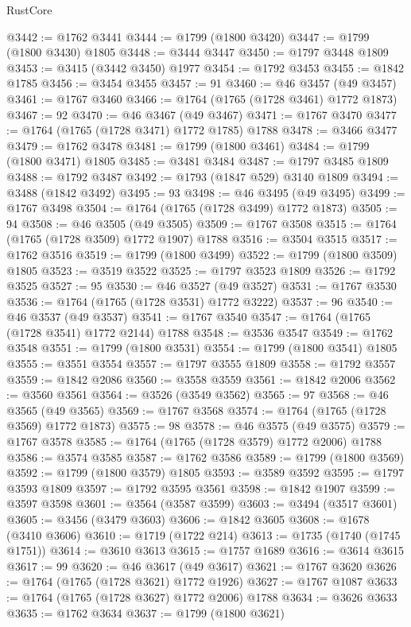 \begin{lexlean}{RustCore}
\begin{coremodule}
@3442 := @1762 @3441
@3444 := @1799 (@1800 @3420)
@3447 := @1799 (@1800 @3430) @1805
@3448 := @3444 @3447
@3450 := @1797 @3448 @1809
@3453 := @3415 (@3442 @3450) @1977
@3454 := @1792 @3453
@3455 := @1842 @1785
@3456 := @3454 @3455
@3457 := 91
@3460 := @46 @3457 (@49 @3457)
@3461 := @1767 @3460
@3466 := @1764 (@1765 (@1728 @3461) @1772 @1873)
@3467 := 92
@3470 := @46 @3467 (@49 @3467)
@3471 := @1767 @3470
@3477 := @1764 (@1765 (@1728 @3471) @1772 @1785) @1788
@3478 := @3466 @3477
@3479 := @1762 @3478
@3481 := @1799 (@1800 @3461)
@3484 := @1799 (@1800 @3471) @1805
@3485 := @3481 @3484
@3487 := @1797 @3485 @1809
@3488 := @1792 @3487
@3492 := @1793 (@1847 @529) @3140 @1809
@3494 := @3488 (@1842 @3492)
@3495 := 93
@3498 := @46 @3495 (@49 @3495)
@3499 := @1767 @3498
@3504 := @1764 (@1765 (@1728 @3499) @1772 @1873)
@3505 := 94
@3508 := @46 @3505 (@49 @3505)
@3509 := @1767 @3508
@3515 := @1764 (@1765 (@1728 @3509) @1772 @1907) @1788
@3516 := @3504 @3515
@3517 := @1762 @3516
@3519 := @1799 (@1800 @3499)
@3522 := @1799 (@1800 @3509) @1805
@3523 := @3519 @3522
@3525 := @1797 @3523 @1809
@3526 := @1792 @3525
@3527 := 95
@3530 := @46 @3527 (@49 @3527)
@3531 := @1767 @3530
@3536 := @1764 (@1765 (@1728 @3531) @1772 @3222)
@3537 := 96
@3540 := @46 @3537 (@49 @3537)
@3541 := @1767 @3540
@3547 := @1764 (@1765 (@1728 @3541) @1772 @2144) @1788
@3548 := @3536 @3547
@3549 := @1762 @3548
@3551 := @1799 (@1800 @3531)
@3554 := @1799 (@1800 @3541) @1805
@3555 := @3551 @3554
@3557 := @1797 @3555 @1809
@3558 := @1792 @3557
@3559 := @1842 @2086
@3560 := @3558 @3559
@3561 := @1842 @2006
@3562 := @3560 @3561
@3564 := @3526 (@3549 @3562)
@3565 := 97
@3568 := @46 @3565 (@49 @3565)
@3569 := @1767 @3568
@3574 := @1764 (@1765 (@1728 @3569) @1772 @1873)
@3575 := 98
@3578 := @46 @3575 (@49 @3575)
@3579 := @1767 @3578
@3585 := @1764 (@1765 (@1728 @3579) @1772 @2006) @1788
@3586 := @3574 @3585
@3587 := @1762 @3586
@3589 := @1799 (@1800 @3569)
@3592 := @1799 (@1800 @3579) @1805
@3593 := @3589 @3592
@3595 := @1797 @3593 @1809
@3597 := @1792 @3595 @3561
@3598 := @1842 @1907
@3599 := @3597 @3598
@3601 := @3564 (@3587 @3599)
@3603 := @3494 (@3517 @3601)
@3605 := @3456 (@3479 @3603)
@3606 := @1842 @3605
@3608 := @1678 (@3410 @3606)
@3610 := @1719 (@1722 @214)
@3613 := @1735 (@1740 (@1745 @1751))
@3614 := @3610 @3613
@3615 := @1757 @1689
@3616 := @3614 @3615
@3617 := 99
@3620 := @46 @3617 (@49 @3617)
@3621 := @1767 @3620
@3626 := @1764 (@1765 (@1728 @3621) @1772 @1926)
@3627 := @1767 @1087
@3633 := @1764 (@1765 (@1728 @3627) @1772 @2006) @1788
@3634 := @3626 @3633
@3635 := @1762 @3634
@3637 := @1799 (@1800 @3621)

\end{coremodule}
\end{lexlean}

